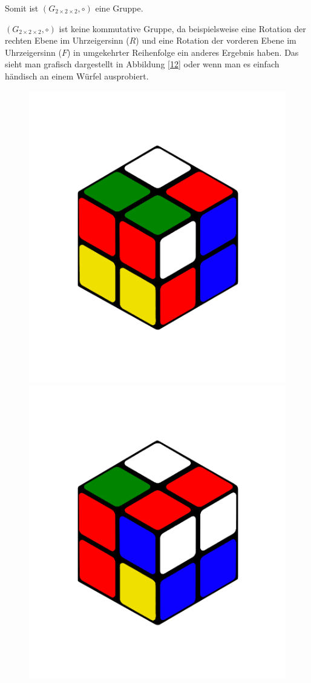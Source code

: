 \documentclass[12pt,a4paper, usenames, dvipsnames]{article}
\theoremstyle{mystyle}
\theoremstyle{definition}
\newcommand{\Gtwo}{\ensuremath{G_{2\times 2\times 2}}}
\begin{document}
Somit ist $(\Gtwo, \circ)$ eine Gruppe. 


$(\Gtwo, \circ)$ ist keine kommutative Gruppe, da beispielsweise eine Rotation der rechten Ebene im Uhrzeigersinn ($R$) und eine Rotation der vorderen Ebene im Uhrzeigersinn ($F$) in umgekehrter Reihenfolge ein anderes Ergebnis haben. Das sieht man grafisch dargestellt in Abbildung \ref{12} oder wenn man es einfach händisch an einem Würfel ausprobiert.
\begin{figure}[h]
\centering
\includegraphics[scale=0.1]{RF.png}
\includegraphics[scale=0.1]{FR.png}

\end{figure}
\end{document}
